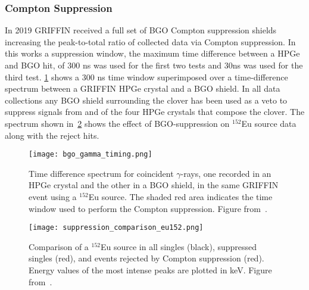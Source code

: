 \documentclass[cnatzke_thesis_proposal.tex]{subfiles}
\begin{document}
\subsubsection{Compton Suppression}
In 2019 GRIFFIN received a full set of BGO Compton suppression shields increasing the peak-to-total ratio of collected data via Compton suppression.
In this works a suppression window, the maximum time difference between a HPGe and BGO hit, of 300 ns was used for the first two tests and 30ns was used for the third test. \ref{fig:bgo_gamma_timing} shows a 300 ns time window superimposed over a time-difference spectrum between a GRIFFIN HPGe crystal and a BGO shield. 
In all data collections any BGO shield surrounding the clover has been used as a veto to suppress signals from and of the four HPGe crystals that compose the clover. 
The spectrum shown in~\ref{fig:suppression_comparison_eu152} shows the effect of BGO-suppression on $^{152}$Eu source data along with the reject hits.

\begin{figure}[htbp]
  \centering
  \texttt{[image: bgo\_gamma\_timing.png]}
  \caption{Time difference spectrum for coincident $\gamma$-rays, one recorded in an HPGe crystal and the other in a BGO shield, in the same GRIFFIN event using a $^{152}$Eu source. The shaded red area indicates the time window used to perform the Compton suppression. Figure from~\cite{porzio_configuration_2021}.}
  \label{fig:bgo_gamma_timing}
\end{figure}

\begin{figure}[htbp]
  \centering
  \texttt{[image: suppression\_comparison\_eu152.png]}
  \caption{Comparison of a $^{152}$Eu source in all singles (black), suppressed singles (red), and events rejected by Compton suppression (red). Energy values of the most intense peaks are plotted in keV. Figure from~\cite{porzio_configuration_2021}.}
  \label{fig:suppression_comparison_eu152}
\end{figure}

\end{document}
